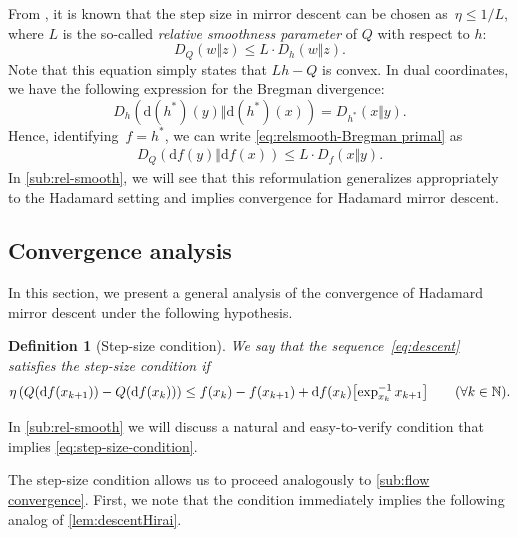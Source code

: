 \documentclass[11pt,letterpaper]{article}
\newtheorem{definition}[theorem]{Definition}\AddToHook{env/definition/begin}{\crefalias{theorem}{definition}}
\numberwithin{equation}{section}
\newcommand{\NN}{\mathbb{N}}
\newcommand{\diff}{\mathrm{d}}
\begin{document}
From \cite[Thm.~1]{BBT2017}, \cite[Thm.~3.1]{LFN2018} it is known that the step size in mirror descent can be chosen as~$\eta \le 1/L$, where $L$ is the so-called \emph{relative smoothness parameter} of $Q$ with respect to $h$:
\begin{equation}\label{eq:relsmooth-Bregman primal}
    D_{Q}( w \Vert z ) \leq L \cdot D_{h}(w \Vert z).
\end{equation}
Note that this equation simply states that $Lh - Q$ is convex.
In dual coordinates, we have the following expression for the Bregman divergence:
\begin{equation*}
    D_h(\diff(h^*)(y)\Vert \diff(h^*)(x)) = D_{h^*}(x\Vert y).
\end{equation*}
Hence, identifying~$f = h^*$, we can write \cref{eq:relsmooth-Bregman primal} as
\begin{align}\label{eq:relsmooth-Bregman dual}
    D_{Q}(\diff f(y)\Vert \diff f(x)) \leq L \cdot D_f(x\Vert y).
\end{align}
In \cref{sub:rel-smooth}, we will see that this reformulation generalizes appropriately to the Hadamard setting and implies convergence for Hadamard mirror descent.

\subsection{Convergence analysis}\label{sub:descent convergence}
In this section, we present a general analysis of the convergence of Hadamard mirror descent under the following hypothesis.

\begin{definition}[Step-size condition]
\label{def:step-size-condition}
We say that the sequence~\eqref{eq:descent} satisfies the step-size condition if
\begin{equation}\label{eq:step-size-condition}
    \eta\left(Q(\diff f(x_{k+1})) - Q(\diff f(x_k))\right) \le f(x_k) - f(x_{k+1}) + \diff f(x_k)\mleft[\exp_{x_k}^{-1}x_{k+1}\mright]
\qquad (\forall k \in \NN).
\end{equation}
\end{definition}

\noindent
In \cref{sub:rel-smooth} we will discuss a natural and easy-to-verify condition that implies \cref{eq:step-size-condition}.

The step-size condition allows us to proceed analogously to \cref{sub:flow convergence}.
First, we note that the condition immediately implies the following analog of \cref{lem:descentHirai}.
\end{document}
